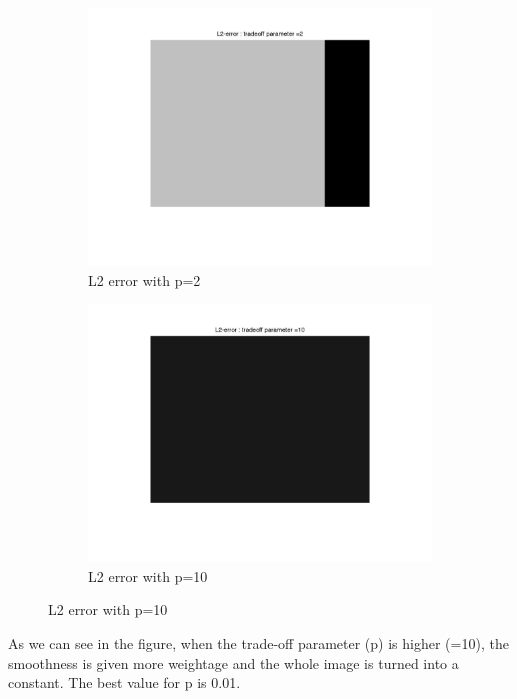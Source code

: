 \documentclass[fleqn]{article}
\begin{document}
\begin{figure}
\begin{subfigure}{0.5\textwidth}
\includegraphics[scale=0.2]{./pics/map_L2_error_p=2.jpg}
\caption{L2 error with p=2}
\end{subfigure}
 \begin{subfigure}{0.5\textwidth}
\includegraphics[scale=0.2]{./pics/map_L2_error_p=10.jpg}
\caption{L2 error with p=10}
\end{subfigure}
\end{figure}

As we can see in the figure, when the trade-off parameter (p) is higher (=10), 
the smoothness is given more weightage and the whole image is turned into a constant.
The best value for p is 0.01.
\end{document}
